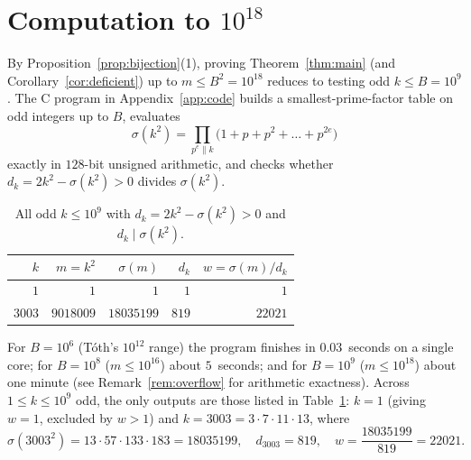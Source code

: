 \documentclass[11pt]{amsart}
\theoremstyle{definition}
\theoremstyle{remark}
\begin{document}
\section{Computation to $10^{18}$}

By Proposition~\ref{prop:bijection}(1), proving Theorem~\ref{thm:main} (and Corollary~\ref{cor:deficient}) up to $m \le B^2 = 10^{18}$ reduces to testing odd $k \le B = 10^9$. The C program in Appendix~\ref{app:code} builds a smallest-prime-factor table on odd integers up to $B$, evaluates
\[
  \sigma(k^2) = \prod_{p^e \parallel k} \bigl(1 + p + p^2 + \dots + p^{2e}\bigr)
\]
exactly in $128$-bit unsigned arithmetic, and checks whether $d_k = 2k^2 - \sigma(k^2) > 0$ divides $\sigma(k^2)$.

\begin{table}[ht]
\centering
\caption{All odd $k \le 10^9$ with $d_k = 2k^2 - \sigma(k^2) > 0$ and $d_k \mid \sigma(k^2)$.}\label{tab:solutions}
\begin{tabular}{rrrrr}
\toprule
$k$ & $m = k^2$ & $\sigma(m)$ & $d_k$ & $w = \sigma(m)/d_k$ \\
\midrule
$1$ & $1$ & $1$ & $1$ & $1$ \\
$3003$ & $9018009$ & $18035199$ & $819$ & $22021$ \\
\bottomrule
\end{tabular}
\end{table}

For $B = 10^6$ (T\'oth's $10^{12}$ range) the program finishes in $0.03$~seconds on a single core; for $B = 10^8$ ($m \le 10^{16}$) about $5$~seconds; and for $B = 10^9$ ($m \le 10^{18}$) about one minute (see Remark~\ref{rem:overflow} for arithmetic exactness). Across $1 \le k \le 10^9$ odd, the only outputs are those listed in Table~\ref{tab:solutions}: $k = 1$ (giving $w = 1$, excluded by $w > 1$) and $k = 3003 = 3 \cdot 7 \cdot 11 \cdot 13$, where
\[
  \sigma(3003^2) = 13 \cdot 57 \cdot 133 \cdot 183 = 18035199, \quad d_{3003} = 819, \quad w = \frac{18035199}{819} = 22021.
\]
\end{document}

